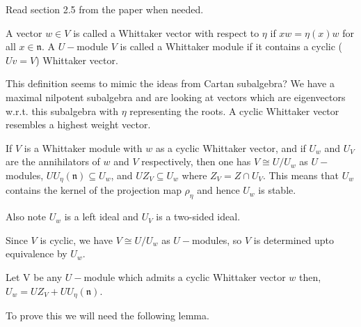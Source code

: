 \documentclass{article}
\newcommand\orangebox[1]{\fcolorbox{ocre}{mygray}{\hspace{1em}#1\hspace{1em}}}
\theoremstyle{mytheoremstyle}
\theoremstyle{mytheoremstyle}
\theoremstyle{myproblemstyle}
\begin{document}
    \orangebox{TODO} Read section 2.5 from the paper when needed.

    \begin{definition}
	A vector $w \in V$ is called a Whittaker vector with respect to $\eta$ if $xw = \eta(x)w$ for all $x \in \mathfrak n$.
	A $U-$module $V$ is called a Whittaker module if it contains a cyclic ($Uv = V$) Whittaker vector.
    \end{definition}

    \begin{remark}
	This definition seems to mimic the ideas from Cartan subalgebra? We have a maximal nilpotent subalgebra and are looking 
	at vectors which are eigenvectors w.r.t. this subalgebra with $\eta$ representing the roots.
	A cyclic Whittaker vector resembles a highest weight vector.
    \end{remark}
    
    If $V$ is a Whittaker module with $w$ as a cyclic Whittaker vector, and if $U_w$ and $U_V$ are the annihilators of $w$ and $V$ 
    respectively, then one has $V \cong U/U_w$ as $U-$modules, $UU_\eta(\mathfrak n) \subseteq U_w$, and $UZ_V \subseteq U_w$ where 
    $Z_V = Z \cap U_V$. This means that $U_w$ contains the kernel of the projection map $\rho_\eta$ and hence $U_w$ is stable.

    Also note $U_w$ is a left ideal and $U_V$ is a two-sided ideal.
    \\

    \begin{remark}
    Since $V$ is cyclic, we have $V \cong U/U_w$ as $U-$modules, so $V$ is determined upto equivalence by $U_w$.
    \label{remark:V-determined-by-U-w}
    \end{remark}
    

    \begin{theorem}[$U_w$ decomposition]
    \label{thm:U_w_decomposition}
	 Let V be any $U-$module which admits a cyclic Whittaker vector $w$ then, $U_w = UZ_V + UU_\eta(\mathfrak n)$. 
    \end{theorem}

    To prove this we will need the following lemma. 
\end{document}
